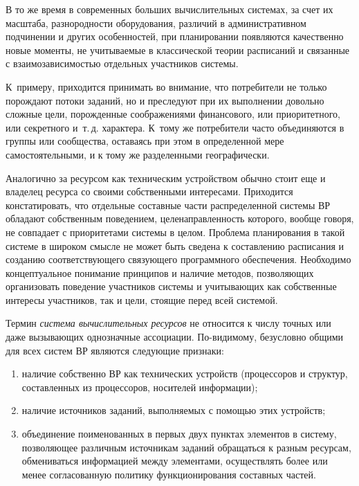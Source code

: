 \begin{multicols}{2}
  В то же время в современных больших вычислительных системах, за счет их масштаба, 
разнородности оборудования, различий в административном подчинении и других 
особенностей, при планировании появляются качественно новые моменты, не учитываемые 
в классической теории расписаний и связанные с взаимозависимостью отдельных 
участников системы. 

К~примеру, приходится принимать во внимание, что потребители не 
только порождают потоки заданий, но и преследуют при их выполнении довольно сложные 
цели, порожденные соображениями финансового, или приоритетного, или секретного и~т.\,д. 
характера. К~тому же потребители часто объединяются в группы или сообщества, оставаясь 
при этом в определенной мере самостоятельными, и к тому же разделенными географически. 

Аналогично за ресурсом как техническим устройством обычно стоит еще и владелец 
ресурса со своими собственными интересами. Приходится констатировать, что отдельные 
составные части распределенной системы ВР обладают собственным поведением, 
целенаправленность которого, вообще говоря, не совпадает с приоритетами сис\-те\-мы в 
целом. Проблема планирования в такой системе в широком смысле не может быть сведена к 
составлению расписания и созданию со\-от\-вет\-ст\-ву\-юще\-го связующего программного 
обеспечения. Необходимо концептуальное понимание принципов и наличие методов, 
позволяющих организовать поведение участников системы и учитывающих как собственные 
интересы участников, так и цели, стоящие перед всей системой.
  
  Термин \textit{система вычислительных ресурсов} не относится к числу точных или даже 
вызывающих однозначные ассоциации. По-видимому, безусловно общими для всех систем 
ВР являются следующие признаки: 
  \begin{enumerate}[(1)]
  \item наличие собственно ВР как технических устройств (процессоров и структур, 
составленных из процессоров, носителей информации);
  \item наличие источников заданий, выполняемых с помощью этих устройств;
  \item объединение поименованных в первых двух пунктах элементов в систему, 
позволяющее различным источникам заданий обращаться к разным ресурсам, 
обмениваться информацией между элементами, осуществлять более или менее 
согласованную политику функционирования составных частей.
  \end{enumerate}
  

\end{multicols}
